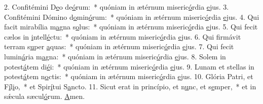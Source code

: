 2. Confitémini D\uline{e}o de\uline{ó}rum:~* quóniam in ætérnum miseric\uline{ó}rdia \uline{e}jus.
3. Confitémini Dómino d\uline{o}min\uline{ó}rum:~* quóniam in ætérnum miseric\uline{ó}rdia \uline{e}jus.
4. Qui facit mirabília m\uline{a}gna s\uline{o}lus:~* quóniam in ætérnum miseric\uline{ó}rdia \uline{e}jus.
5. Qui fecit cælos in \uline{i}ntell\uline{é}ctu:~* quóniam in ætérnum miseric\uline{ó}rdia \uline{e}jus.
6. Qui firmávit terram s\uline{u}per \uline{a}quas:~* quóniam in ætérnum miseric\uline{ó}rdia \uline{e}jus.
7. Qui fecit lumin\uline{á}ria m\uline{a}gna:~* quóniam in ætérnum miseric\uline{ó}rdia \uline{e}jus.
8. Solem in potest\uline{á}tem di\uline{é}i:~* quóniam in ætérnum miseric\uline{ó}rdia \uline{e}jus.
9. Lunam et stellas in potest\uline{á}tem n\uline{o}ctis:~* quóniam in ætérnum miseric\uline{ó}rdia \uline{e}jus.
10. Glória Patri, et F\uline{í}l\uline{i}o,~* et Spir\uline{í}tui S\uline{a}ncto.
11. Sicut erat in princípio, et n\uline{u}nc, et s\uline{e}mper,~* et in sǽcula sæcul\uline{ó}rum. \uline{A}men.
